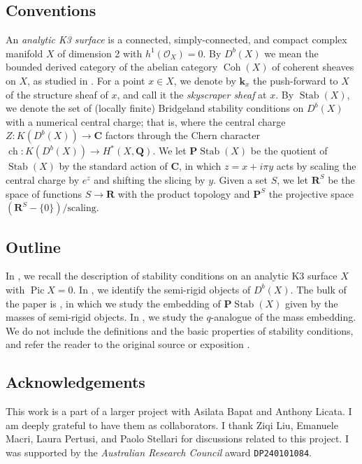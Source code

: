 \documentclass{amsart}
\begin{document}
\subsection{Conventions}
An \emph{analytic K3 surface} is a connected, simply-connected, and compact complex manifold \(X\) of dimension 2 with \(h^1(\mathcal{O}_X) = 0\).
By \(D^b(X)\) we mean the bounded derived category of the abelian category \(\operatorname{Coh}(X)\) of coherent sheaves on \(X\), as studied in \cite{huy.mac.ste:08}.
For a point \(x \in X\), we denote by \(\mathbf{k}_x\) the push-forward to \(X\) of the structure sheaf of \(x\), and call it the \emph{skyscraper sheaf} at \(x\).
By \(\operatorname{Stab}(X)\), we denote the set of (locally finite) Bridgeland stability conditions on \(D^b(X)\) with a numerical central charge; that is, where the central charge \(Z \colon K(D^b(X)) \to \mathbf{C}\) factors through the Chern character \(\operatorname{ch} \colon K(D^b(X)) \to H^{*}(X, \mathbf{Q})\).
We let \(\mathbf{P} \operatorname{Stab}(X)\) be the quotient of \(\operatorname{Stab}(X)\) by the standard action of \(\mathbf{C}\), in which \(z = x + i\pi y\) acts by scaling the central charge by \(e^{z}\) and shifting the slicing by \(y\).
Given a set \(S\), we let \(\mathbf{R}^S\) be the space of functions \(S \to \mathbf{R}\) with the product topology and \(\mathbf{P}^S\) the projective space \(\left(\mathbf{R}^S - \{0\}\right) / \text{scaling}\).
\subsection{Outline}
In , we recall the description of stability conditions on an analytic K3 surface \(X\) with \(\operatorname{Pic} X = 0\).
In , we identify the semi-rigid objects of \(D^b(X)\).
The bulk of the paper is , in which we study the embedding of \(\mathbf{P} \operatorname{Stab}(X)\) given by the masses of semi-rigid objects.
In , we study the \(q\)-analogue of the mass embedding.
We do not include the definitions and the basic properties of stability conditions, and refer the reader to the original source \cite{bri:07} or exposition \cite{bay:11}.

\subsection{Acknowledgements}
This work is a part of a larger project with Asilata Bapat and Anthony Licata.
I am deeply grateful to have them as collaborators.
I thank Ziqi Liu, Emanuele Macri, Laura Pertusi, and Paolo Stellari for discussions related to this project.
I was supported by the \emph{Australian Research Council} award \texttt{DP240101084}.
\end{document}
